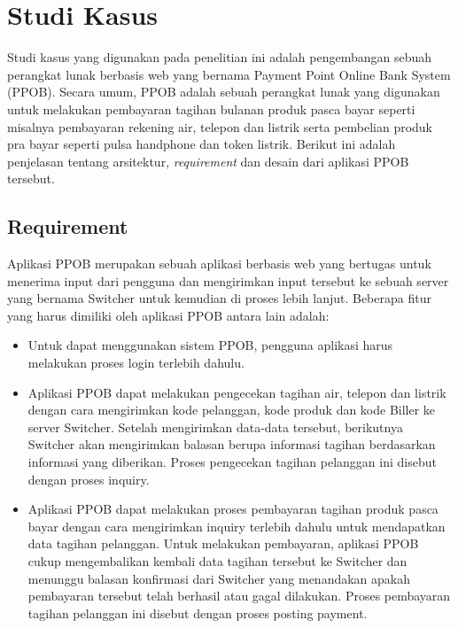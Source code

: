 \chapter{Studi Kasus}

Studi kasus yang digunakan pada penelitian ini adalah pengembangan sebuah perangkat lunak berbasis web yang bernama Payment Point Online Bank System (PPOB). Secara umum, PPOB adalah sebuah perangkat lunak yang digunakan untuk melakukan pembayaran tagihan bulanan produk pasca bayar seperti misalnya pembayaran rekening air, telepon dan listrik serta pembelian produk pra bayar seperti pulsa handphone dan token listrik. Berikut ini adalah penjelasan tentang arsitektur, \textit{requirement} dan desain dari aplikasi PPOB tersebut.

\section{Requirement}
Aplikasi PPOB merupakan sebuah aplikasi berbasis web yang bertugas untuk menerima input dari pengguna dan mengirimkan input tersebut ke sebuah server yang bernama Switcher untuk kemudian di proses lebih lanjut. Beberapa fitur yang harus dimiliki oleh aplikasi PPOB antara lain adalah:

\begin{itemize}
    \item Untuk dapat menggunakan sistem PPOB, pengguna aplikasi harus melakukan proses login terlebih dahulu.
    \item Aplikasi PPOB dapat melakukan pengecekan tagihan air, telepon dan listrik dengan cara mengirimkan kode pelanggan, kode produk dan kode Biller ke server Switcher. Setelah mengirimkan data-data tersebut, berikutnya Switcher akan mengirimkan balasan berupa informasi tagihan berdasarkan informasi yang diberikan. Proses pengecekan tagihan pelanggan ini disebut dengan proses inquiry.
    \item Aplikasi PPOB dapat melakukan proses pembayaran tagihan produk pasca bayar dengan cara mengirimkan inquiry terlebih dahulu untuk mendapatkan data tagihan pelanggan. Untuk melakukan pembayaran, aplikasi PPOB cukup mengembalikan kembali data tagihan tersebut ke Switcher dan menunggu balasan konfirmasi dari Switcher yang menandakan apakah pembayaran tersebut telah berhasil atau gagal dilakukan. Proses pembayaran tagihan pelanggan ini disebut dengan proses posting payment.
\end{itemize}